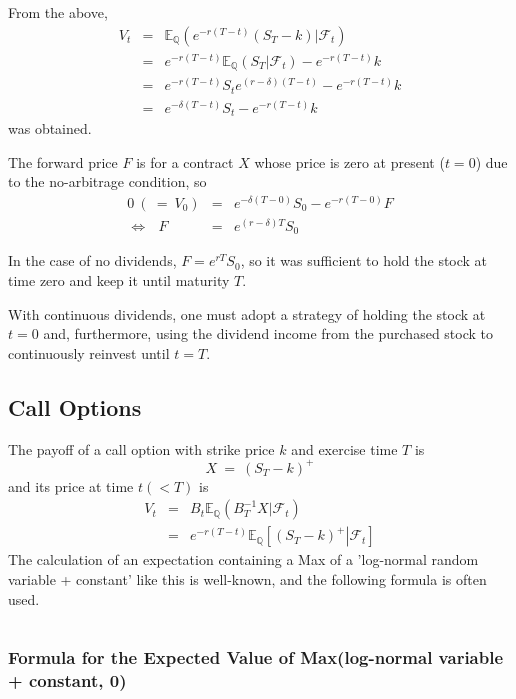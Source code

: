 \documentclass[uplatex,a4j,12pt,dvipdfmx]{jsarticle}
\begin{document}
From the above,
%
%
\begin{eqnarray*}
	V_{t}
	&=&
	\mathbb{E}_{\mathbb{Q}} ( e^{-r(T-t)} (S_{T} - k) | \mathcal{F}_{t} )
	\\ &=&
	e^{-r(T-t)} \mathbb{E}_{\mathbb{Q}} ( S_{T}  | \mathcal{F}_{t} ) - e^{-r(T-t)} k
	\\ &=&
	e^{-r(T-t)} S_{t} e^{(r-\delta)(T-t)} - e^{-r(T-t)} k
	\\ &=&
	e^{-\delta(T-t)}S_{t} - e^{-r(T-t)} k
\end{eqnarray*}
%
%
was obtained.

The forward price $F$ is for a contract $X$ whose price is zero at present ($t=0$) due to the no-arbitrage condition, so
%
%
\begin{eqnarray*}
	0\
	( \ = \
	V_{0})
	&=&
	e^{- \delta ( T - 0 ) } S_{0} - e^{-r(T-0)} F
	\\
	\Longleftrightarrow \ \ \
	F &=&
	e^{(r - \delta) T } S_{0}
\end{eqnarray*}
%
%

In the case of no dividends, $F=e^{rT}S_{0}$, so it was sufficient to hold the stock at time zero and keep it until maturity $T$.

With continuous dividends, one must adopt a strategy of holding the stock at $t=0$ and, furthermore, using the dividend income from the purchased stock to continuously reinvest until $t=T$.

\subsection{Call Options}

The payoff of a call option with strike price $k$ and exercise time $T$ is
$$
	X
	\ = \
	(S_{T} - k)^{+}
$$
and its price at time $t(<T)$ is
%
%
\begin{eqnarray*}
	V_{t}
	&=&
	B_{t}
	\mathbb{E}_{\mathbb{Q}} ( B^{-1}_{T} X | \mathcal{F}_{t} )
	\\ &=&
	e^{-r(T-t)}
	\mathbb{E}_{\mathbb{Q}} \left[ \left. \left( S_{T} - k \right)^{+} \right| \mathcal{F}_{t} \right]
\end{eqnarray*}
%
%
The calculation of an expectation containing a Max of a 'log-normal random variable + constant' like this is well-known, and the following formula is often used.

${}$

\subsubsection*{Formula for the Expected Value of Max(log-normal variable + constant, 0)}
\end{document}

